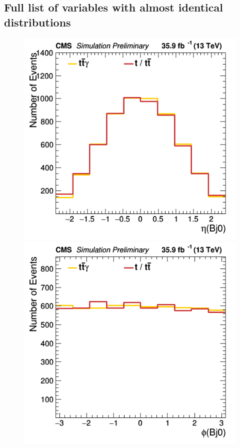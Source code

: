 \documentclass[11pt]{scrartcl}
\begin{document}
	\subsection{Full list of variables with almost identical distributions}
	\label{sec:annex-identical}
	\begin{figure}[H]
	\centering
	\begin{minipage}{.5\textwidth}
	  \centering
	  \includegraphics[width=0.75\linewidth]{figures/Notused/Bj0_eta.png}
	\end{minipage}%
	\begin{minipage}{.5\textwidth}
	  \centering
	  \includegraphics[width=0.75\linewidth]{figures/Notused/Bj0_phi.png}
	\end{minipage}
	\end{figure}
	
\end{document}
